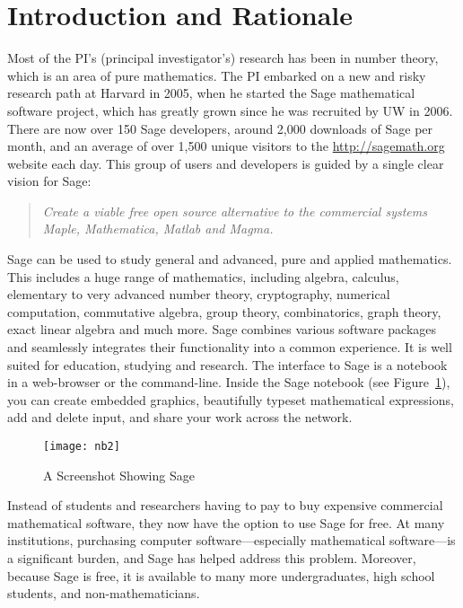 \documentclass[11pt]{article}
\begin{document}
\section{Introduction and Rationale}


Most of the PI's (principal investigator's) research has been in
number theory, which is an area of pure mathematics.  The PI embarked
on a new and risky research path at Harvard in 2005, when he started
the Sage mathematical software project, which has greatly grown since
he was recruited by UW in 2006.  There are now over 150 Sage
developers, around 2,000 downloads of Sage per month, and an average
of over 1,500 unique visitors to the \url{http://sagemath.org} website
each day.  This group of users and developers is guided by a single
clear vision for Sage:

\begin{quote} {\em Create a viable free open source alternative
    to the commercial systems Maple, Mathematica, Matlab and Magma.}
\end{quote}

Sage can be used to study general and advanced, pure and applied
mathematics. This includes a huge range of mathematics, including
algebra, calculus, elementary to very advanced number theory,
cryptography, numerical computation, commutative algebra, group
theory, combinatorics, graph theory, exact linear algebra and much
more.  Sage combines various software packages and seamlessly
integrates their functionality into a common experience. It is well
suited for education, studying and research.  The interface to Sage is
a notebook in a web-browser or the command-line. 
Inside the Sage notebook (see Figure~\ref{fig:sagenb}), you can create
embedded graphics, beautifully typeset mathematical expressions, add
and delete input, and share your work across the network.

\begin{figure}[ht]
\begin{center}
\texttt{[image: nb2]}
\caption{A Screenshot Showing Sage\label{fig:sagenb}}
\end{center}
\end{figure}

Instead of students and researchers having to pay to buy expensive
commercial mathematical software, they now have the option to use Sage
for free.  At many institutions, purchasing computer
software---especially mathematical software---is a significant burden,
and Sage has helped address this problem.  Moreover, because Sage is
free, it is available to many more undergraduates, high school
students, and non-mathematicians.
\end{document}
